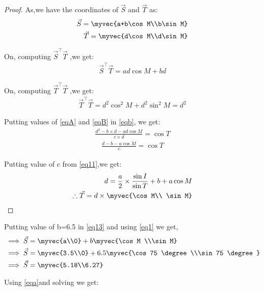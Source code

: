 \documentclass[journal,12pt,twocolumn]{IEEEtran}
\begin{document}
\begin{enumerate}
\begin{proof}
\item As,we have the coordinates of $\vec{S}$ and $\vec{T}$ as:
\begin{align}
    \vec{S}=\myvec{a+b\cos M\\b\sin M}
    \\
    \vec{T}=\myvec{d\cos M\\d\sin M}
\end{align}
\item On, computing $\vec{S}^\intercal \vec{T}$ ,we get:
\begin{align}
\vec{S}^\intercal \vec{T}= ad \cos M + bd \label{eqA}
\end{align}
\item On, computing $\vec{T}^\intercal \vec{T}$ ,we get:
\begin{align}
    \vec{T}^\intercal \vec{T}= d^2\cos^2 M+d^2\sin^2 M=d^2 
    \label{eqB}
\end{align}
\item Putting values of \eqref{eqA} and \eqref{eqB} in \eqref{eqb}, we get:
\begin{align}
\frac{d^2-b\times d-ad\cos M}{c\times d} =\cos T
\end{align}
\begin{align}
\frac{d-b-a\cos M}{c} =\cos T
\end{align}
\item Putting value of c from \eqref{eq11},we get:
\begin{align}
d=\frac{a}{2}\times\frac{\sin I}{\sin T}+ b+a \cos M    \label{eqa}
\\
\therefore \vec{T}=d \times{\myvec{\cos M\\ \sin M}}
\end{align}
\end{proof}
\item Putting value of b=6.5 in \eqref{eq13} and using \eqref{eq1} we get,
\begin{align}
&\implies \vec{S}=\myvec{a\\0} +b\myvec{\cos M \\\sin M}
\\
&\implies \vec{S}=\myvec{3.5\\0} +6.5\myvec{\cos 75 \degree\\\sin 75 \degree} 
\\
&\implies \vec{S}=\myvec{5.18\\6.27}
\end{align}
\item Using \eqref{eqa}and solving we get:
\begin{align}

\end{align}
\end{enumerate}
\end{document}
